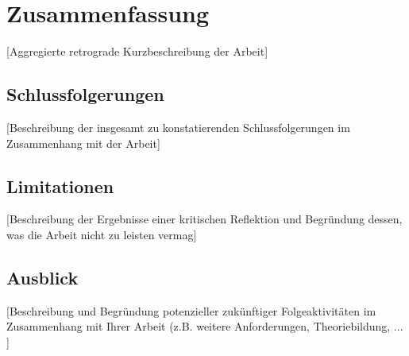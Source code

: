 \documentclass[oneside,bibliography=totocnumbered,BCOR=5mm]{scrbook}
\begin{document}
\chapter{Zusammenfassung}
[Aggregierte retrograde Kurzbeschreibung der Arbeit]
\section{Schlussfolgerungen}
[Beschreibung der insgesamt zu konstatierenden Schlussfolgerungen im Zusammenhang mit der Arbeit]
\section{Limitationen}
[Beschreibung der Ergebnisse einer kritischen Reflektion und Begr\"undung dessen, was die Arbeit nicht zu leisten vermag]
\section{Ausblick}
[Beschreibung und Begr\"undung potenzieller zuk\"unftiger Folgeaktivit\"aten im Zusammenhang mit Ihrer Arbeit (z.B. weitere Anforderungen, Theoriebildung, ... ]


























% 
% 

\end{document}
